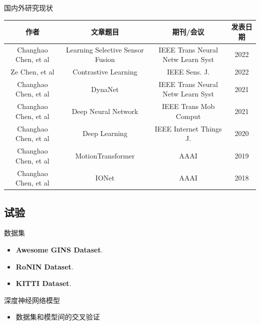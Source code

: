 \documentclass{beamer} %
\begin{document}
\begin{frame}{国内外研究现状}
    
    
    \begin{table}
    \tiny
        \begin{tabular}{cccc}
            \toprule
            作者 & 文章题目 & 期刊/会议 & 发表日期 \\
            \midrule
            Changhao Chen, et al & Learning Selective Sensor Fusion\cite{chen2021dynanet} & IEEE Trans Neural Netw Learn Syst & 2022 \\
            Ze Chen, et al & Contrastive Learning\cite{chen2022contrastive} & IEEE Sens. J. & 2022 \\
            Changhao Chen, et al & DynaNet\cite{chen2021dynanet} & IEEE Trans Neural Netw Learn Syst & 2021 \\
            Changhao Chen, et al & Deep Neural Network\cite{chen2021deep} & IEEE Trans Mob Comput & 2021 \\
            Changhao Chen, et al & Deep Learning\cite{chen2020deep} & IEEE Internet Things J. & 2020 \\
            Changhao Chen, et al & MotionTransformer\cite{chen2018transferring} & AAAI & 2019 \\
            Changhao Chen, et al & IONet\cite{chen2018ionet} & AAAI & 2018 \\
            \bottomrule
        \end{tabular}
    \end{table}
\end{frame}

\subsection{试验}

\begin{frame}{数据集}
    \begin{itemize}
        \item \textbf{Awesome GINS Dataset}\cite{Tang2022}.
        \item \textbf{RoNIN Dataset}\cite{herath2020ronin}.
        \item \textbf{KITTI Dataset}\cite{Geiger2013IJRR}.
    \end{itemize}
\end{frame}

\begin{frame}{深度神经网络模型}
    \begin{itemize}
        \item 数据集和模型间的交叉验证
    \end{itemize}
\end{frame}
\end{document}
